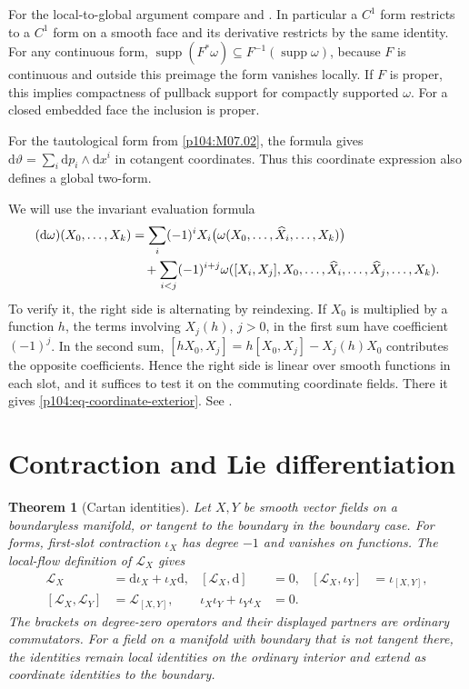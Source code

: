 \documentclass[11pt,oneside,openany]{book}
\newtheorem{theorem}{Theorem}[chapter]
\theoremstyle{definition}
\theoremstyle{remark}
\newcommand{\dd}{\mathrm d}
\DeclareMathOperator{\supp}{supp}
\begin{document}
For the local-to-global argument compare \cite[Theorem 14.24 and Proposition 14.26]{lee} and \cite[Section 19]{tu}. In particular a \(C^1\) form restricts to a \(C^1\) form on a smooth face and its derivative restricts by the same identity. For any continuous form, \(\supp(F^*\omega)\subseteq F^{-1}(\supp\omega)\), because \(F\) is continuous and outside this preimage the form vanishes locally. If \(F\) is proper, this implies compactness of pullback support for compactly supported \(\omega\). For a closed embedded face the inclusion is proper.

For the tautological form from \cref{p104:M07.02}, the formula gives \(\dd\vartheta=\sum_i\dd p_i\wedge\dd x^i\) in cotangent coordinates. Thus this coordinate expression also defines a global two-form.

We will use the invariant evaluation formula
\begin{align}
 (\dd\omega)(X_0,\ldots,X_k)
 &=\sum_i(-1)^i X_i\big(\omega(X_0,\ldots,\widehat X_i,\ldots,X_k)\big)
 \notag\\
 &\quad+\sum_{i<j}(-1)^{i+j}
 \omega([X_i,X_j],X_0,\ldots,\widehat X_i,\ldots,\widehat X_j,\ldots,X_k).
 \label{p104:eq-invariant-exterior}
\end{align}
To verify it, the right side is alternating by reindexing. If \(X_0\) is multiplied by a function \(h\), the terms involving \(X_j(h)\), \(j>0\), in the first sum have coefficient \((-1)^j\). In the second sum, \([hX_0,X_j]=h[X_0,X_j]-X_j(h)X_0\) contributes the opposite coefficients. Hence the right side is linear over smooth functions in each slot, and it suffices to test it on the commuting coordinate fields. There it gives \eqref{p104:eq-coordinate-exterior}. See \cite[Propositions 14.29 and 14.32]{lee}.

\section{Contraction and Lie differentiation}

\begin{theorem}[Cartan identities]
\label{p104:M07.04}
Let \(X,Y\) be smooth vector fields on a boundaryless manifold, or tangent to the boundary in the boundary case. For forms, first-slot contraction \(\iota_X\) has degree \(-1\) and vanishes on functions. The local-flow definition of \(\mathcal L_X\) gives
\begin{align*}
 \mathcal L_X&=\dd\iota_X+\iota_X\dd, &
 [\mathcal L_X,\dd]&=0, &
 [\mathcal L_X,\iota_Y]&=\iota_{[X,Y]},\\
 [\mathcal L_X,\mathcal L_Y]&=\mathcal L_{[X,Y]}, &
 \iota_X\iota_Y+\iota_Y\iota_X&=0 .
\end{align*}
The brackets on degree-zero operators and their displayed partners are ordinary commutators. For a field on a manifold with boundary that is not tangent there, the identities remain local identities on the ordinary interior and extend as coordinate identities to the boundary.
\end{theorem}
\end{document}

